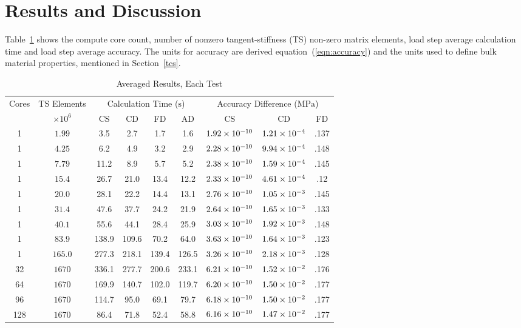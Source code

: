 \documentclass[preprint,12pt]{elsarticle}
\begin{document}
\section{Results and Discussion}
\label{sec:Res}
%
Table~\ref{tab:results} shows the compute core count, number of nonzero tangent-stiffness (TS) non-zero matrix elements, load step average calculation time and load step average accuracy. The units for accuracy are derived equation~(\ref{eqn:accuracy}) and the units used to define bulk material properties, mentioned in Section~\ref{tcs}.
%
\begin{table}[!ht]    
  \scriptsize
  \centering
        \caption{Averaged Results, Each Test} \label{tab:results}   
       \begin{tabular}{c c c c c c c c c}
         \toprule
         Cores & TS Elements & \multicolumn{4}{c}{Calculation Time ($\si{\second}$)} & \multicolumn{3}{c}{Accuracy Difference ($\si{\mega\pascal}$)} \\ 
         & $\times 10^6$ & CS & CD & FD & AD & CS & CD & FD \\
        \midrule
        1 & $\num{1.99}$  & 3.5 & 2.7 & 1.7 & 1.6 & $\num{1.92E-10}$ & $\num{1.21E-4}$ & .137 \\
        1 & $\num{4.25}$  & 6.2& 4.9& 3.2& 2.9 & $\num{2.28E-10}$& $\num{9.94E-4}$ & .148 \\
        1 & $\num{7.79}$  & 11.2& 8.9& 5.7& 5.2 & $\num{2.38E-10}$& $\num{1.59E-4}$ & .145\\
        1 & $\num{15.4}$  & 26.7& 21.0& 13.4& 12.2 & $\num{2.33E-10}$ & $\num{4.61E-4}$ & .12 \\
        1 & $\num{20.0}$  & 28.1& 22.2& 14.4& 13.1 & $\num{2.76E-10}$ & $\num{1.05E-3}$ & .145 \\
        1 & $\num{31.4}$  & 47.6& 37.7& 24.2& 21.9 & $\num{2.64E-10}$ & $\num{1.65E-3}$ & .133 \\
        1 & $\num{40.1}$  & 55.6& 44.1& 28.4& 25.9 & $\num{3.03E-10}$ & $\num{1.92E-3}$ & .148 \\
        1 & $\num{83.9}$  & 138.9& 109.6& 70.2& 64.0 & $\num{3.63E-10}$ & $\num{1.64E-3}$ & .123 \\
        1 & $\num{165.0}$  & 277.3& 218.1& 139.4& 126.5 & $\num{3.26E-10}$ & $\num{2.18E-3}$ & .128 \\
        32 & $\num{1670}$  & 336.1& 277.7& 200.6& 233.1 & $\num{6.21E-10}$ & $\num{1.52E-2}$ & .176 \\
        64 & $\num{1670}$  & 169.9& 140.7& 102.0& 119.7 & $\num{6.20E-10}$ & $\num{1.50E-2}$ & .177 \\
        96 & $\num{1670}$  & 114.7& 95.0& 69.1 & 79.7 & $\num{6.18E-10}$ & $\num{1.50E-2}$ & .177 \\
        128 & $\num{1670}$  & 86.4& 71.8& 52.4 &58.8 & $\num{6.16E-10}$ & $\num{1.47E-2}$ & .177 \\
        \bottomrule
    \end{tabular}
\end{table}
\end{document}

